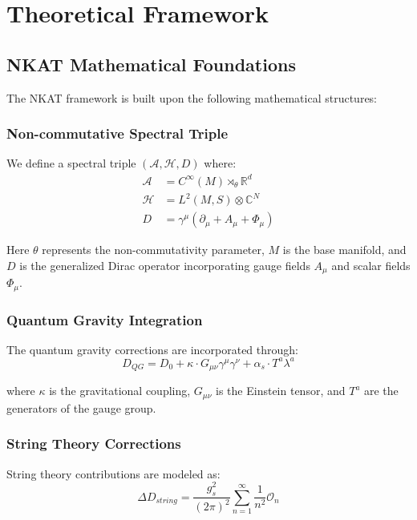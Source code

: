 \documentclass[12pt,a4paper]{article}
\begin{document}
\section{Theoretical Framework}

\subsection{NKAT Mathematical Foundations}

The NKAT framework is built upon the following mathematical structures:

\subsubsection{Non-commutative Spectral Triple}
We define a spectral triple $(\mathcal{A}, \mathcal{H}, D)$ where:
\begin{align}
\mathcal{A} &= C^\infty(M) \rtimes_\theta \mathbb{R}^d \\
\mathcal{H} &= L^2(M, S) \otimes \mathbb{C}^N \\
D &= \gamma^\mu(\partial_\mu + A_\mu + \Phi_\mu)
\end{align}

Here $\theta$ represents the non-commutativity parameter, $M$ is the base manifold, and $D$ is the generalized Dirac operator incorporating gauge fields $A_\mu$ and scalar fields $\Phi_\mu$.

\subsubsection{Quantum Gravity Integration}
The quantum gravity corrections are incorporated through:
\begin{equation}
D_{QG} = D_0 + \kappa \cdot G_{\mu\nu} \gamma^\mu \gamma^\nu + \alpha_s \cdot T^a \lambda^a
\end{equation}

where $\kappa$ is the gravitational coupling, $G_{\mu\nu}$ is the Einstein tensor, and $T^a$ are the generators of the gauge group.

\subsubsection{String Theory Corrections}
String theory contributions are modeled as:
\begin{equation}
\Delta D_{string} = \frac{g_s^2}{(2\pi)^2} \sum_{n=1}^{\infty} \frac{1}{n^2} \mathcal{O}_n
\end{equation}
\end{document}
